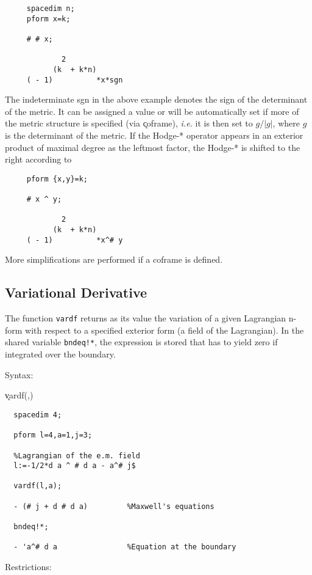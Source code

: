 \begin{verbatim}
     spacedim n;
     pform x=k;

     # # x;

             2
           (k  + k*n)
     ( - 1)          *x*sgn
\end{verbatim}
{} 
The indeterminate sgn in the above example denotes the sign of the
determinant of the metric. It can be assigned a value or will be
automatically set if more of the metric structure is specified (via
\k{coframe}), \emph{i.e.} it is then set to $g/|g|$, where $g$ is the
determinant of the metric.  If the Hodge-* operator appears in an
exterior product of maximal degree as the leftmost factor, the Hodge-*
is shifted to the right according to

\begin{verbatim}
     pform {x,y}=k;

     # x ^ y;

             2
           (k  + k*n)
     ( - 1)          *x^# y
\end{verbatim}

More simplifications are performed if a coframe is defined.



\subsection{Variational Derivative}

 
\hypertarget{operator:VARDF}{}
The function \texttt{vardf}\label{VARDF} returns as its value the
variation of a given Lagrangian n-form with respect to a specified
exterior form (a field of the Lagrangian).  In the shared variable
\texttt{bndeq!*}, the expression is stored that has to yield zero if
integrated over the boundary.

Syntax:

\hspace*{2em} \k{vardf}(,)

\example{}
\begin{verbatim}
  spacedim 4;

  pform l=4,a=1,j=3;

  %Lagrangian of the e.m. field
  l:=-1/2*d a ^ # d a - a^# j$

  vardf(l,a);

  - (# j + d # d a)         %Maxwell's equations

  bndeq!*;

  - 'a^# d a                %Equation at the boundary
\end{verbatim}
Restrictions:

